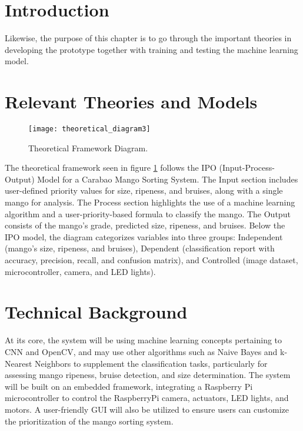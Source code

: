 

\section{Introduction}

Likewise, the purpose of this chapter is to go through the important theories in developing the prototype together with training and testing the machine learning model.

\section{Relevant Theories and Models}

\begin{figure}[!htbp]
	\centering
	\texttt{[image: theoretical\_diagram3]}
	\caption{Theoretical Framework Diagram.}
	\label{fig:theoreticalDiagram1}
\end{figure}

The theoretical framework seen in figure \ref{fig:theoreticalDiagram1} 
follows the IPO (Input-Process-Output) Model for a Carabao Mango Sorting
System. The Input section includes user-defined priority values for size,
ripeness, and bruises, along with a single mango for analysis. The Process
section highlights the use of a machine learning algorithm and a
user-priority-based formula to classify the mango. The Output consists of the
mango’s grade, predicted size, ripeness, and bruises. Below the IPO model, the
diagram categorizes variables into three groups: Independent (mango’s size,
ripeness, and bruises), Dependent (classification report with accuracy,
precision, recall, and confusion matrix), and Controlled (image dataset,
microcontroller, camera, and LED lights).

\section{Technical Background}

At its core, the system will be using machine learning concepts pertaining to
\gls{CNN} and OpenCV, and may use other algorithms such as Naive Bayes and
k-Nearest Neighbors to supplement the classification tasks, particularly for
assessing mango ripeness, bruise detection, and size determination. The system
will be built on an embedded framework, integrating a Raspberry Pi
microcontroller to control the RaspberryPi camera, actuators, LED lights, and
motors. A user-friendly GUI will also be utilized to ensure users can customize
the prioritization of the mango sorting system.

